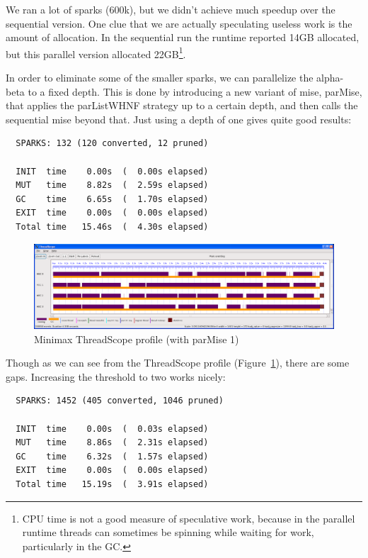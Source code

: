 \documentclass[twocolumn,9pt]{sigplanconf}
\newcommand{\codef}[1]{{\fontfamily{cmss}\small#1}}
\begin{document}
We ran a lot of sparks (600k), but we didn't achieve much speedup over
the sequential version.
One clue that we are actually speculating useless work is the amount
of allocation.  In the sequential run the runtime reported 14GB
allocated, but this parallel version allocated 22GB\footnote{CPU time
  is not a good measure of speculative work, because in the parallel
  runtime threads can sometimes be spinning while waiting for work,
  particularly in the GC.}.

In order to eliminate some of the smaller sparks, we can
parallelize the alpha-beta to a fixed depth.  This is done by
introducing a new variant of \codef{mise}, \codef{parMise}, that
applies the \codef{parListWHNF} strategy up to a certain depth, and then
calls the sequential \codef{mise} beyond that.  Just using a depth of
one gives quite good results:

\begin{verbatim}
  SPARKS: 132 (120 converted, 12 pruned)

  INIT  time    0.00s  (  0.00s elapsed)
  MUT   time    8.82s  (  2.59s elapsed)
  GC    time    6.65s  (  1.70s elapsed)
  EXIT  time    0.00s  (  0.00s elapsed)
  Total time   15.46s  (  4.30s elapsed)
\end{verbatim}

\begin{figure}
\begin{center}
\includegraphics[scale=0.3]{minimax2.png}
\end{center}
\caption{Minimax ThreadScope profile (with parMise 1)}
\label{f:minimax-threadscope2}
\end{figure}

Though as we can see from the ThreadScope profile
(Figure~\ref{f:minimax-threadscope2}), there are some gaps.
Increasing the threshold to two works nicely:

\begin{verbatim}
  SPARKS: 1452 (405 converted, 1046 pruned)

  INIT  time    0.00s  (  0.03s elapsed)
  MUT   time    8.86s  (  2.31s elapsed)
  GC    time    6.32s  (  1.57s elapsed)
  EXIT  time    0.00s  (  0.00s elapsed)
  Total time   15.19s  (  3.91s elapsed)
\end{verbatim}
\end{document}

